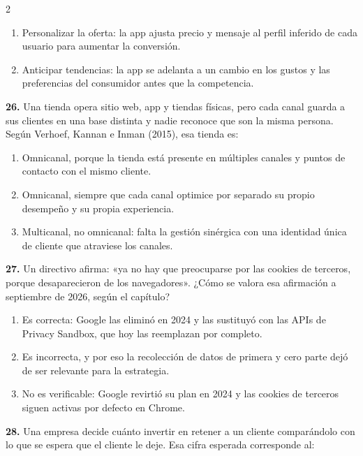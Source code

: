 \documentclass[10pt,letterpaper]{article}
\begin{document}
\begin{multicols}{2}
\begin{enumerate}[label=\alph*),leftmargin=1.1em,itemsep=0pt,topsep=1pt,parsep=0pt,partopsep=0pt]
\item Personalizar la oferta: la app ajusta precio y mensaje al perfil inferido de cada usuario para aumentar la conversión.
\item Anticipar tendencias: la app se adelanta a un cambio en los gustos y las preferencias del consumidor antes que la competencia.
\end{enumerate}
\vspace{2pt}
\noindent\textbf{26.} Una tienda opera sitio web, app y tiendas físicas, pero cada canal guarda a sus clientes en una base distinta y nadie reconoce que son la misma persona. Según Verhoef, Kannan e Inman (2015), esa tienda es:
\vspace{-3pt}
\begin{enumerate}[label=\alph*),leftmargin=1.1em,itemsep=0pt,topsep=1pt,parsep=0pt,partopsep=0pt]
\item Omnicanal, porque la tienda está presente en múltiples canales y puntos de contacto con el mismo cliente.
\item Omnicanal, siempre que cada canal optimice por separado su propio desempeño y su propia experiencia.
\item Multicanal, no omnicanal: falta la gestión sinérgica con una identidad única de cliente que atraviese los canales.
\end{enumerate}
\vspace{2pt}
\noindent\textbf{27.} Un directivo afirma: «ya no hay que preocuparse por las cookies de terceros, porque desaparecieron de los navegadores». ¿Cómo se valora esa afirmación a septiembre de 2026, según el capítulo?
\vspace{-3pt}
\begin{enumerate}[label=\alph*),leftmargin=1.1em,itemsep=0pt,topsep=1pt,parsep=0pt,partopsep=0pt]
\item Es correcta: Google las eliminó en 2024 y las sustituyó con las APIs de Privacy Sandbox, que hoy las reemplazan por completo.
\item Es incorrecta, y por eso la recolección de datos de primera y cero parte dejó de ser relevante para la estrategia.
\item No es verificable: Google revirtió su plan en 2024 y las cookies de terceros siguen activas por defecto en Chrome.
\end{enumerate}
\vspace{2pt}
\noindent\textbf{28.} Una empresa decide cuánto invertir en retener a un cliente comparándolo con lo que se espera que el cliente le deje. Esa cifra esperada corresponde al:

\end{multicols}
\end{document}
